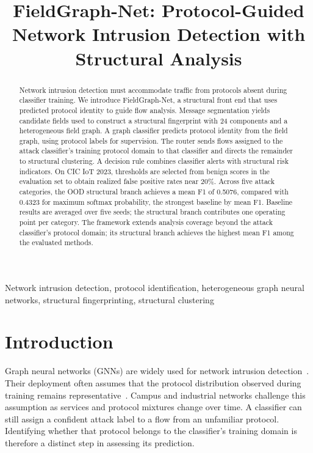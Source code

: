 \documentclass{article}
\title{\textbf{FieldGraph-Net: Protocol-Guided Network Intrusion Detection with Structural Analysis}}
\begin{document}
\ninept
\maketitle

\begin{abstract}
Network intrusion detection must accommodate traffic from protocols absent during
classifier training. We introduce FieldGraph-Net, a structural front end that uses
predicted protocol identity to guide flow analysis. Message segmentation yields
candidate fields used to construct a structural fingerprint with 24 components and
a heterogeneous field graph. A graph classifier predicts protocol identity from
the field graph, using protocol labels for supervision. The router sends flows
assigned to the attack classifier's training protocol domain to that classifier
and directs the remainder to structural clustering. A decision rule combines
classifier alerts with structural risk indicators. On CIC IoT 2023, thresholds are
selected from benign scores in the evaluation set to obtain realized false
positive rates near 20\%. Across five attack categories, the OOD structural branch achieves a
mean F1 of 0.5076, compared with 0.4323 for maximum softmax probability, the
strongest baseline by mean F1. Baseline results are averaged over five seeds;
the structural branch contributes one operating point per category. The framework extends
analysis coverage beyond the attack classifier's protocol domain; its structural
branch achieves the highest mean F1 among the evaluated methods.
\end{abstract}

\begin{keywords}
Network intrusion detection, protocol identification, heterogeneous graph neural networks, structural fingerprinting, structural clustering
\end{keywords}

\section{Introduction}
\label{sec:intro}

Graph neural networks (GNNs) are widely used for network intrusion
detection~\cite{farrukh2023xgnid,zhou2020gnn,lo2022egraphsage}. Their deployment often
assumes that the protocol distribution observed during training remains
representative~\cite{khraisat2019survey}. Campus and industrial networks challenge
this assumption as services and protocol mixtures change over time. A classifier
can still assign a confident attack label to a flow from an unfamiliar protocol.
Identifying whether that protocol belongs to the classifier's training domain is
therefore a distinct step in assessing its prediction.
\end{document}
